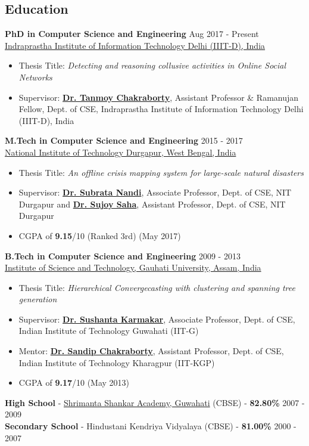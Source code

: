 \documentclass[margin, centered]{res}
\begin{document}
\begin{resume}
\section{Education}
\textbf{PhD in Computer Science and Engineering} \hfill Aug 2017 - Present \\
\href{http://www.iiitd.ac.in/}{Indraprastha Institute of Information Technology Delhi (IIIT-D), India}
\begin{itemize}
 \item Thesis Title: \textit{Detecting and reasoning collusive activities in Online Social Networks}
 \item Supervisor: \href{https://sites.google.com/site/tanmoychakra88/}{\textbf{Dr. Tanmoy Chakraborty}}, Assistant Professor \& Ramanujan Fellow, Dept. of CSE, Indraprastha Institute of Information Technology Delhi (IIIT-D), India
\end{itemize}
\textbf{M.Tech in Computer Science and Engineering} \hfill 2015 - 2017 \\
\href{http://www.nitdgp.ac.in/}{National Institute of Technology Durgapur, West Bengal, India}
\begin{itemize}
 \item Thesis Title: \textit{An offline crisis mapping system for large-scale natural disasters}
 \item Supervisor: \href{http://www.nitdgp.ac.in/cse/s_nandi/s_nandi.php}{\textbf{Dr. Subrata Nandi}}, Associate Professor, Dept. of CSE, NIT Durgapur and \href{http://www.nitdgp.ac.in/cse/s_saha/s_saha.php}{\textbf{Dr. Sujoy Saha}}, Assistant Professor, Dept. of CSE, NIT Durgapur
 \item CGPA of \textbf{9.15}/10 (Ranked 3rd) (May 2017)
\end{itemize}
\textbf{B.Tech in Computer Science and Engineering} \hfill 2009 - 2013 \\
\href{http://www.gauhati.ac.in/}{Institute of Science and Technology, Gauhati University, Assam, India}
\begin{itemize}
 \item Thesis Title: \textit{Hierarchical Convergecasting with clustering and spanning tree generation}
 \item Supervisor: \href{https://www.iitg.ac.in/sushantak/}{\textbf{Dr. Sushanta Karmakar}}, Associate Professor, Dept. of CSE, Indian Institute of Technology Guwahati (IIT-G)
 \item Mentor: \href{http://cse.iitkgp.ac.in/~sandipc/}{\textbf{Dr. Sandip Chakraborty}}, Assistant Professor, Dept. of CSE, Indian Institute of Technology Kharagpur (IIT-KGP)
 \item CGPA of \textbf{9.17}/10 (May 2013)
\end{itemize}
\textbf{High School} - \href{http://www.ssa-school.org/}{Shrimanta Shankar Academy, Guwahati} (CBSE) - \textbf{82.80\%} \hfill 2007 - 2009 \\
\textbf{Secondary School} - Hindustani Kendriya Vidyalaya (CBSE) - \textbf{81.00\%} \hfill 2000 - 2007
 



\end{resume}
\end{document}
